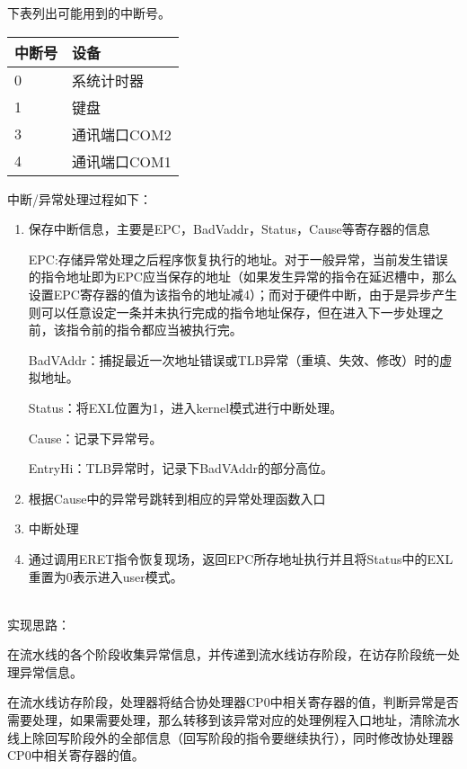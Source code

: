 下表列出可能用到的中断号。

\begin{table}[H]
	\centering
	\begin{tabular}{ll}
		\hline
		中断号&设备\\
		\hline
		0&系统计时器\\
		1&键盘\\
		3&通讯端口COM2\\
		4&通讯端口COM1\\
		\hline
	\end{tabular}
\end{table}

中断/异常处理过程如下：

\begin{enumerate}
	\item 保存中断信息，主要是EPC，BadVaddr，Status，Cause等寄存器的信息
	
	\qquad EPC:存储异常处理之后程序恢复执行的地址。对于一般异常，当前发生错误的指令地址即为EPC应当保存的地址（如果发生异常的指令在延迟槽中，那么设置EPC寄存器的值为该指令的地址减4）；而对于硬件中断，由于是异步产生则可以任意设定一条并未执行完成的指令地址保存，但在进入下一步处理之前，该指令前的指令都应当被执行完。
	
	\qquad BadVAddr：捕捉最近一次地址错误或TLB异常（重填、失效、修改）时的虚拟地址。
	
	\qquad Status：将EXL位置为1，进入kernel模式进行中断处理。
	
	\qquad Cause：记录下异常号。
	
	\qquad EntryHi：TLB异常时，记录下BadVAddr的部分高位。
	
	\item 根据Cause中的异常号跳转到相应的异常处理函数入口
	
	\item 中断处理
	
	\item 通过调用ERET指令恢复现场，返回EPC所存地址执行并且将Status中的EXL重置为0表示进入user模式。
	
\end{enumerate}

\quad \\
实现思路：

在流水线的各个阶段收集异常信息，并传递到流水线访存阶段，在访存阶段统一处理异常信息。

在流水线访存阶段，处理器将结合协处理器CP0中相关寄存器的值，判断异常是否需要处理，如果需要处理，那么转移到该异常对应的处理例程入口地址，清除流水线上除回写阶段外的全部信息（回写阶段的指令要继续执行），同时修改协处理器CP0中相关寄存器的值。

